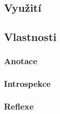 \subsection{Využití}
\subsection{Vlastnosti}
\subsubsection{Anotace}
\subsubsection{Introspekce}
\subsubsection{Reflexe}
 
